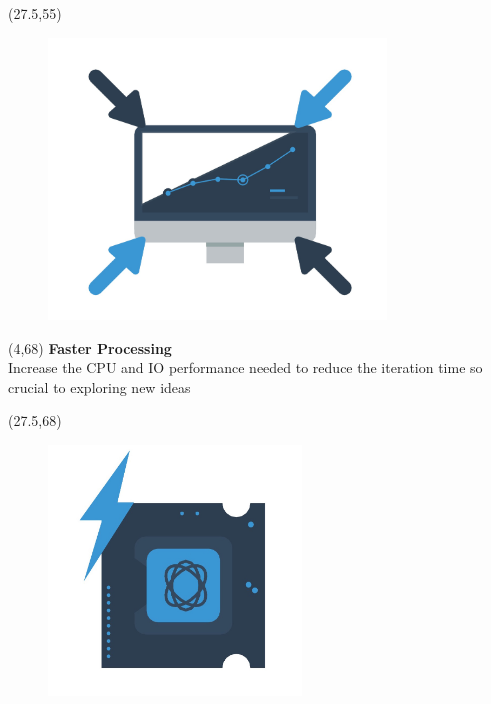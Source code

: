 \documentclass[final]{beamer}
\begin{document}
\begin{frame}{}
\begin{textblock}{12.5}(27.5,55)
\begin{figure}[tbph]
\centering
\includegraphics[width=0.8\textwidth]{images/collaborate.jpg}
\end{figure}
\end{textblock}


\begin{textblock}{22.5}(4,68)
\textcolor{mybluelabel}{\bf Faster Processing} \\
Increase the CPU and IO performance needed to reduce the iteration time so crucial to exploring new ideas
\end{textblock}

\begin{textblock}{12.5}(27.5,68)
\begin{figure}[tbph]
\centering
\includegraphics[width=0.6\textwidth]{images/faster-processing.jpg}
\end{figure}
\end{textblock}


\end{frame}
\end{document}
